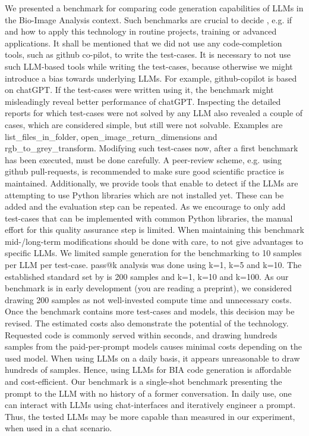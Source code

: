\documentclass{ecai}
\begin{document}
We presented a benchmark for comparing code generation capabilities of LLMs in the Bio-Image Analysis context. Such benchmarks are crucial to decide , e.g. if and how to apply this technology in routine projects, training or advanced applications. 
It shall be mentioned that we did not use any code-completion tools, such as github co-pilot, to write the test-cases. It is necessary to not use such LLM-based tools while writing the test-cases, because otherwise we might introduce a bias towards underlying LLMs. For example, github-copilot is based on chatGPT. If the test-cases were written using it, the benchmark might misleadingly reveal better performance of chatGPT.
Inspecting the detailed reports for which test-cases were not solved by any LLM also revealed a couple of cases, which are considered simple, but still were not solvable. Examples are list\_files\_in\_folder, open\_image\_return\_dimensions and rgb\_to\_grey\_transform. Modifying such test-cases now, after a first benchmark has been executed, must be done carefully. A peer-review scheme, e.g. using github pull-requests, is recommended to make sure good scientific practice is maintained. Additionally, we provide tools that enable to detect if the LLMs are attempting to use Python libraries which are not installed yet. These can be added and the evaluation step can be repeated. As we encourage to only add test-cases that can be implemented with common Python libraries, the manual effort for this quality assurance step is limited. When maintaining this benchmark mid-/long-term modifications should be done with care, to not give advantages to specific LLMs.
We limited sample generation for the benchmarking to 10 samples per LLM per test-case. pass@k analysis was done using k=1, k=5 and k=10. The established standard set by \citep{chen2021evaluating} is 200 samples and k=1, k=10 and k=100. As our benchmark is in early development (you are reading a preprint), we considered drawing 200 samples as not well-invested compute time and unnecessary costs. Once the benchmark contains more test-cases and models, this decision may be revised. 
The estimated costs also demonstrate the potential of the technology. Requested code is commonly served within seconds, and drawing hundreds samples from the paid-per-prompt models causes minimal costs depending on the used model. When using LLMs on a daily basis, it appears unreasonable to draw hundreds of samples. Hence, using LLMs for BIA code generation is affordable and cost-efficient.
Our benchmark is a single-shot benchmark presenting the prompt to the LLM with no history of a former conversation. In daily use, one can interact with LLMs using chat-interfaces and iteratively engineer a prompt. Thus, the tested LLMs may be more capable than measured in our experiment, when used in a chat scenario.
\end{document}
